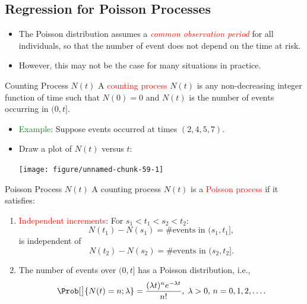 \documentclass{article}\usepackage[]{graphicx}\usepackage[svgnames]{xcolor}
\newenvironment{knitrout}{}{} %
\begin{document}
\subsection*{Regression for Poisson Processes}
\begin{itemize}
      \item The Poisson distribution assumes a \textcolor{Red}{\emph{common observation period}} for all individuals,
            so that the number of event does not depend on the time at risk.
      \item However, this may not be the case for many situations in practice.
\end{itemize}
\begin{Regular}{Counting Process $ N(t) $}
      A \textcolor{Red}{counting process} $ N(t) $ is any non-decreasing integer function of time such that
      $ N(0)=0 $ and $ N(t) $ is the number of events occurring in $ (0,t] $.
\end{Regular}
\begin{itemize}
      \item \textcolor{Green}{Example}: Suppose events occurred at times $ (2,4,5,7) $.
      \item Draw a plot of $ N(t) $ versus $ t $:
\begin{knitrout}
\color{fgcolor}

{\centering \texttt{[image: figure/unnamed-chunk-59-1]} 

}


\end{knitrout}
\end{itemize}
\begin{Regular}{Poisson Process $ N(t) $}
      A counting process $ N(t) $ is a \textcolor{Red}{Poisson process} if it satisfies:
      \begin{enumerate}[1.]
            \item \textcolor{Red}{Independent increments}: For $ s_1<t_1<s_2<t_2 $:
                  \[ N(t_1)-N(s_1)=\text{\# events in $(s_1,t_1]$}, \]
                  is independent of
                  \[ N(t_2)-N(s_2)=\text{\# events in $(s_2,t_2]$}. \]
            \item The number of events over $ (0,t] $ has a Poisson distribution, i.e.,
                  \[ \Prob[\big]{N(t)=n;\lambda}=\frac{(\lambda t)^n e^{-\lambda t}}{n!},\; \lambda>0,\, n=0,1,2,\ldots.  \]
      \end{enumerate}
\end{Regular}
\end{document}

